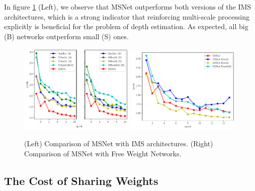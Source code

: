 \documentclass[runningheads]{llncs}
\begin{document}
In figure \ref{fig:mae_SFNvsGenericNets} (Left), we observe that MSNet outperforms both versions of the IMS architectures, which is a strong indicator that reinforcing multi-scale processing explicitly is beneficial for the problem of depth estimation. As expected, all big (B) networks outperform small (S) ones.

\begin{figure}[!htbp]
    \centering
    \includegraphics[width=0.49\textwidth, height=0.3\textwidth]{figures/freiburg_msnet_vs_monolithic_mae.pdf}
    \includegraphics[width=0.49\textwidth, height=0.3\textwidth]{figures/freiburg_msnet_vs_free_weights_mae.pdf}
    \caption{(Left) Comparison of MSNet with IMS architectures. (Right) Comparison of MSNet with Free Weight Networks.}
    \label{fig:mae_SFNvsGenericNets}
\end{figure}

\subsection{The Cost of Sharing Weights}
\end{document}
